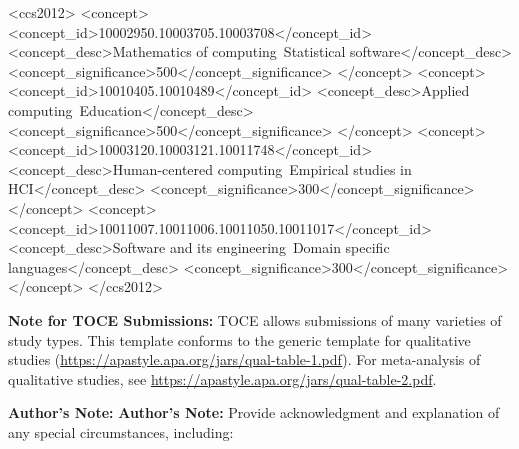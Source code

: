 \documentclass[acmsmall,screen,anonymous,review]{acmart}
\begin{document}
%


\begin{CCSXML}
<ccs2012>
<concept>
<concept_id>10002950.10003705.10003708</concept_id>
<concept_desc>Mathematics of computing~Statistical software</concept_desc>
<concept_significance>500</concept_significance>
</concept>
<concept>
<concept_id>10010405.10010489</concept_id>
<concept_desc>Applied computing~Education</concept_desc>
<concept_significance>500</concept_significance>
</concept>
<concept>
<concept_id>10003120.10003121.10011748</concept_id>
<concept_desc>Human-centered computing~Empirical studies in HCI</concept_desc>
<concept_significance>300</concept_significance>
</concept>
<concept>
<concept_id>10011007.10011006.10011050.10011017</concept_id>
<concept_desc>Software and its engineering~Domain specific languages</concept_desc>
<concept_significance>300</concept_significance>
</concept>
</ccs2012>
\end{CCSXML}



%


%
\maketitle

\textbf{Note for TOCE Submissions:} TOCE allows submissions of many varieties of study types. This template conforms to the generic template for qualitative studies (\url{https://apastyle.apa.org/jars/qual-table-1.pdf}). For meta-analysis of qualitative studies, see \url{https://apastyle.apa.org/jars/qual-table-2.pdf}. 

\textbf{Author's Note:} \textbf{Author's Note:} Provide acknowledgment and explanation of any special circumstances, including:
\end{document}
